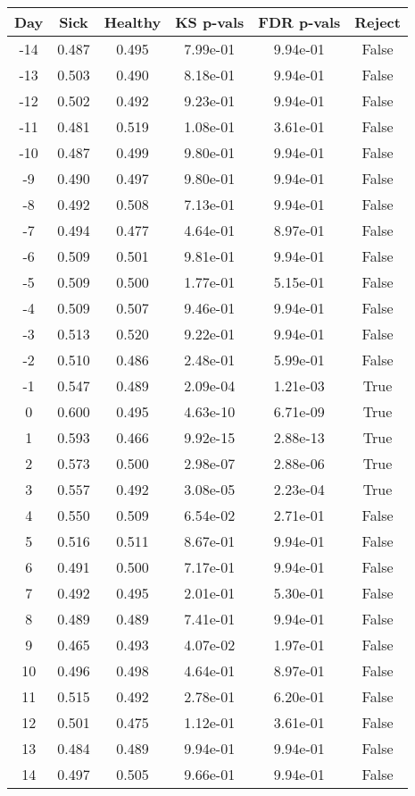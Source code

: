 \begin{tabular}{c|c|c|c|c|c}
Day &  Sick & Healthy &  KS p-vals & FDR p-vals & Reject\\
\hline
-14 & 0.487 &   0.495 &   7.99e-01 &   9.94e-01 &  False\\
-13 & 0.503 &   0.490 &   8.18e-01 &   9.94e-01 &  False\\
-12 & 0.502 &   0.492 &   9.23e-01 &   9.94e-01 &  False\\
-11 & 0.481 &   0.519 &   1.08e-01 &   3.61e-01 &  False\\
-10 & 0.487 &   0.499 &   9.80e-01 &   9.94e-01 &  False\\
 -9 & 0.490 &   0.497 &   9.80e-01 &   9.94e-01 &  False\\
 -8 & 0.492 &   0.508 &   7.13e-01 &   9.94e-01 &  False\\
 -7 & 0.494 &   0.477 &   4.64e-01 &   8.97e-01 &  False\\
 -6 & 0.509 &   0.501 &   9.81e-01 &   9.94e-01 &  False\\
 -5 & 0.509 &   0.500 &   1.77e-01 &   5.15e-01 &  False\\
 -4 & 0.509 &   0.507 &   9.46e-01 &   9.94e-01 &  False\\
 -3 & 0.513 &   0.520 &   9.22e-01 &   9.94e-01 &  False\\
 -2 & 0.510 &   0.486 &   2.48e-01 &   5.99e-01 &  False\\
 -1 & 0.547 &   0.489 &   2.09e-04 &   1.21e-03 &   True\\
  0 & 0.600 &   0.495 &   4.63e-10 &   6.71e-09 &   True\\
  1 & 0.593 &   0.466 &   9.92e-15 &   2.88e-13 &   True\\
  2 & 0.573 &   0.500 &   2.98e-07 &   2.88e-06 &   True\\
  3 & 0.557 &   0.492 &   3.08e-05 &   2.23e-04 &   True\\
  4 & 0.550 &   0.509 &   6.54e-02 &   2.71e-01 &  False\\
  5 & 0.516 &   0.511 &   8.67e-01 &   9.94e-01 &  False\\
  6 & 0.491 &   0.500 &   7.17e-01 &   9.94e-01 &  False\\
  7 & 0.492 &   0.495 &   2.01e-01 &   5.30e-01 &  False\\
  8 & 0.489 &   0.489 &   7.41e-01 &   9.94e-01 &  False\\
  9 & 0.465 &   0.493 &   4.07e-02 &   1.97e-01 &  False\\
 10 & 0.496 &   0.498 &   4.64e-01 &   8.97e-01 &  False\\
 11 & 0.515 &   0.492 &   2.78e-01 &   6.20e-01 &  False\\
 12 & 0.501 &   0.475 &   1.12e-01 &   3.61e-01 &  False\\
 13 & 0.484 &   0.489 &   9.94e-01 &   9.94e-01 &  False\\
 14 & 0.497 &   0.505 &   9.66e-01 &   9.94e-01 &  False\\
\end{tabular}